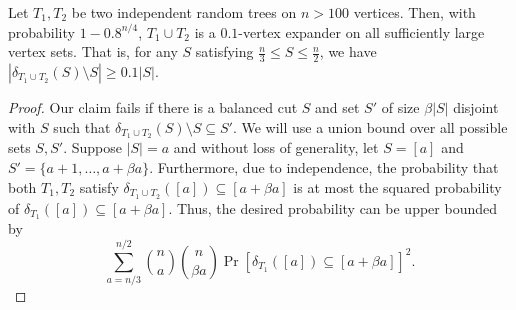 \begin{lem}\label{lem:tree-expander}
Let $T_1, T_2$ be two independent random trees on $n > 100$ vertices. Then, with probability $1-0.8^{n/4}$, $T_1 \cup T_2$ is a $0.1$-vertex expander on all sufficiently large vertex sets. That is, for any $S$ satisfying $\frac{n}{3} \leq S \leq \frac{n}{2}$, we have $|\delta_{T_1 \cup T_2}(S) \setminus S| \geq 0.1 |S|$. 
\end{lem}
\begin{proof}
Our claim fails if there is a balanced cut $S$ and set $S'$ of size $\beta |S|$ disjoint with $S$ such that $\delta_{T_1 \cup T_2}(S) \setminus S \subseteq S'$. We will use a union bound over all possible sets $S, S'$. Suppose $|S| = a$ and without loss of generality, let $S = [a]$ and $S' = \{a+1, \ldots, a+\beta a\}$. Furthermore, due to independence, the probability that both $T_1, T_2$ satisfy $\delta_{T_1 \cup T_2}([a]) \subseteq [a + \beta a]$ is at most the squared probability of $\delta_{T_1}([a]) \subseteq [a + \beta a]$. Thus, the desired probability can be upper bounded by 
\[
    \sum_{a = n/3}^{n/2} \binom{n}{a} \binom{n}{\beta a} \Pr[\delta_{T_1}([a]) \subseteq [a + \beta a]]^2.
\]


\end{proof}
